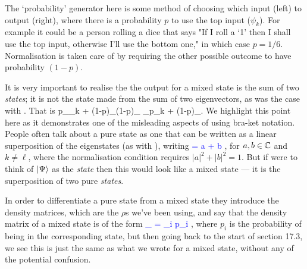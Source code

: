 The `probability' generator here is some method of choosing which input (left) to output (right), where there is a probability $p$ to use the top input ($\psi_k$). For example it could be a person rolling a dice that says "If I roll a `1' then I shall use the top input, otherwise I'll use the bottom one," in which case $p=1/6$. Normalisation is taken care of by requiring the other possible outcome to have probability $(1-p)$. 

\br 
It is very important to realise the the output for a mixed state is the sum of two \emph{states}; it is not the state made from the sum of two eigenvectors, as was the case with . That is 
\bse 
p\rho_{\psi_k} + (1-p)\rho_{(1-p)\psi_{\ell}} \neq \rho_{p\psi_k + (1-p)\psi_{\ell}}.
\ese 
We highlight this point here as it demonstrates one of the misleading aspects of using bra-ket notation. People often talk about a pure state as one that can be written as a linear superposition of the eigenstates (as with ), writing 
\bse
\textcolor{blue}{\ket{\Psi} = a + b\ket{\psi_{\ell}} },
\ese 
for $a,b\in\mathbb{C}$ and $k\neq \ell$, where the normalisation condition requires $|a|^2+|b|^2=1$. But if were to think of \textcolor{blue}{$\ket{\Psi}$} as the \emph{state} then this would look like a mixed state --- it is the superposition of two pure \emph{states}. 

In order to differentiate a pure state from a mixed state they introduce the density matrices, which are the $\rho$s we've been using, and say that the density matrix of a mixed state is of the form 
\bse 
\textcolor{blue}{ \rho_{} = \sum_i p_i  },
\ese 
where $p_i$ is the probability of being in the corresponding state, but then going back to the start of section 17.3, we see this is just the same as what we wrote for a mixed state, without any of the potential confusion. 
\er 